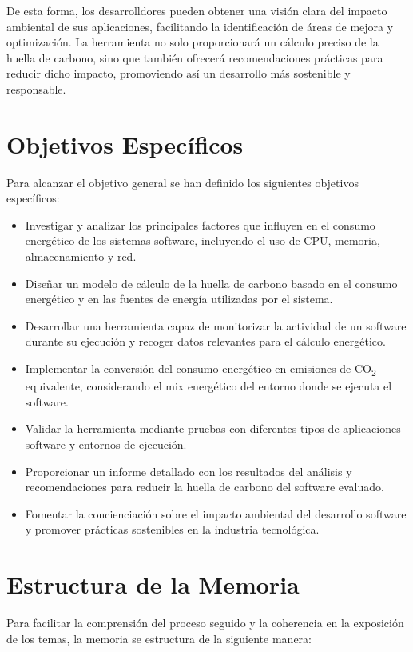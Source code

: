 \documentclass[12pt,a4paper]{report}
\begin{document}
De esta forma, los desarrolldores pueden obtener una visión clara del impacto ambiental de sus aplicaciones, facilitando la identificación de áreas de mejora y optimización. La herramienta no solo proporcionará 
un cálculo preciso de la huella de carbono, sino que también ofrecerá recomendaciones prácticas para reducir dicho impacto, promoviendo así un desarrollo más sostenible y responsable.

\section{Objetivos Específicos}

Para alcanzar el objetivo general se han definido los siguientes objetivos específicos:

\begin{itemize}
    \item Investigar y analizar los principales factores que influyen en el consumo energético de los sistemas software, incluyendo el uso de CPU, memoria, almacenamiento y red.
    \item Diseñar un modelo de cálculo de la huella de carbono basado en el consumo energético y en las fuentes de energía utilizadas por el sistema.
    \item Desarrollar una herramienta capaz de monitorizar la actividad de un software durante su ejecución y recoger datos relevantes para el cálculo energético.
    \item Implementar la conversión del consumo energético en emisiones de CO\textsubscript{2} equivalente, considerando el mix energético del entorno donde se ejecuta el software.
    \item Validar la herramienta mediante pruebas con diferentes tipos de aplicaciones software y entornos de ejecución.
    \item Proporcionar un informe detallado con los resultados del análisis y recomendaciones para reducir la huella de carbono del software evaluado.
    \item Fomentar la concienciación sobre el impacto ambiental del desarrollo software y promover prácticas sostenibles en la industria tecnológica.
\end{itemize}

\section{Estructura de la Memoria}

Para facilitar la comprensión del proceso seguido y la coherencia en la exposición de los temas, la memoria se estructura de la siguiente manera:
\end{document}
